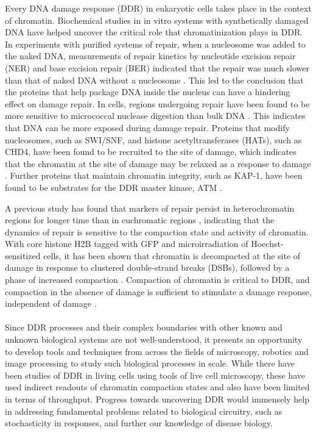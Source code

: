 Every DNA damage response (DDR) in eukaryotic cells takes place in the context of chromatin. Biochemical studies in in vitro systems with synthetically damaged DNA have helped uncover the critical role that chromatinization plays in DDR. In experiments with purified systems of repair, when a nucleosome was added to the naked DNA, measurements of repair kinetics by nucleotide excision repair (NER) and base excision repair (BER) indicated that the repair was much slower than that of naked DNA without a nucleosome \cite{hara2000dna,odell2011nucleosome}. This led to the conclusion that the proteins that help package DNA inside the nucleus can have a hindering effect on damage repair. In cells, regions undergoing repair have been found to be more sensitive to micrococcal nuclease digestion than bulk DNA \cite{smerdon1978distribution}. This indicates that DNA can be more exposed during damage repair. Proteins that modify nucleosomes, such as SWI/SNF, and histone acetyltransferases (HATs), such as CHD4, have been found to be recruited to the site of damage, which indicates that the chromatin at the site of damage may be relaxed as a response to damage \cite{park2006mammalian, polo2010regulation}. Further proteins that maintain chromatin integrity, such as KAP-1, have been found to be substrates for the DDR master kinase, ATM \cite{ziv2006chromatin}.

A previous study has found that markers of repair persist in heterochromatin regions for longer time than in euchromatic regions \cite{goodarzi2008atm}, indicating that the dynamics of repair is sensitive to the compaction state and activity of chromatin. With core histone H2B tagged with GFP and microirradiation of Hoechst-sensitized cells, it has been shown that chromatin is decompacted at the site of damage in response to clustered double-strand breaks (DSBs), followed by a phase of increased compaction \cite{kruhlak2006changes,strickfaden2016poly}. Compaction of chromatin is critical to DDR, and compaction in the absence of damage is sufficient to stimulate a damage response, independent of damage \cite{BURGESS20141703}.

\paragraph*{} Since DDR processes and their complex boundaries with other known and unknown biological systems are not well-understood, it presents an opportunity to develop tools and techniques from across the fields of microscopy, robotics and image processing to study such biological processes in scale. While there have been studies of DDR in living cells using tools of live cell microscopy, these have used indirect readouts of chromatin compaction states and also have been limited in terms of throughput. Progress towards uncovering DDR would immensely help in addressing fundamental problems related to biological circuitry, such as stochasticity in responses, and further our knowledge of disease biology.

